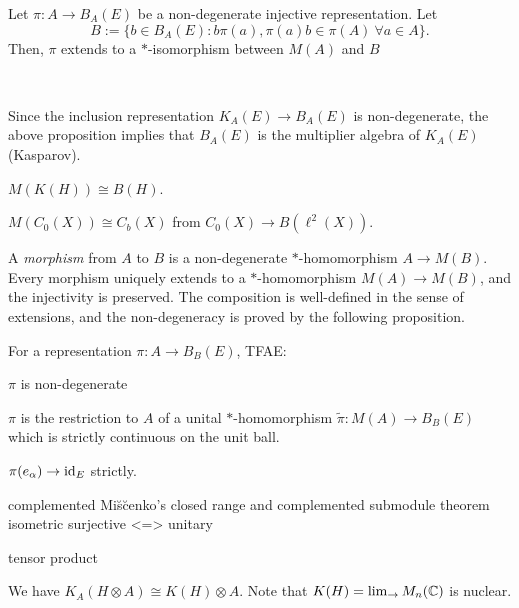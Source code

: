 \documentclass{../../../small}
\begin{document}
\begin{prop}
Let $\pi:A\to B_ A(E)$ be a non-degenerate injective representation.
Let
\[ B:=\{b\in B_ A(E):b\pi(a),\pi(a)b\in\pi(A)\ \forall a\in A\}.\]
Then, $\pi$ extends to a $*$-isomorphism between $M(A)$ and $B$
\end{prop}
\begin{pf}

\end{pf}

\begin{ex}\,
\begin{parts}
\item
Since the inclusion representation $K_ A(E)\to B_ A(E)$ is non-degenerate, the above proposition implies that $B_ A(E)$ is the multiplier algebra of $K_ A(E)$(Kasparov).
\item $M(K(H))\cong B(H)$.
\item $M(C_0(X))\cong C_b(X)$ from $C_0(X)\to B(\ell^2(X))$.
\end{parts}
\end{ex}

\begin{defn}
A \emph{morphism} from $A$ to $B$ is a non-degenerate $*$-homomorphism $A\to M(B)$.
Every morphism uniquely extends to a $*$-homomorphism $M(A)\to M(B)$, and the injectivity is preserved.
The composition is well-defined in the sense of extensions, and the non-degeneracy is proved by the following proposition.
\end{defn}
\begin{lem}
For a representation $\pi:A\to B_ B(E)$, TFAE:
\begin{parts}
\item $\pi$ is non-degenerate
\item $\pi$ is the restriction to $A$ of a unital $*$-homomorphism $\tilde\pi:M(A)\to B_ B(E)$ which is strictly continuous on the unit ball.
\item $\pi(e_\alpha)\to\operatorname{id}_E$ strictly.
\end{parts}
\end{lem}





complemented
Mi\u s\u cenko's closed range and complemented submodule theorem
isometric surjective <=> unitary

tensor product



We have $K_ A(H\otimes A)\cong K(H)\otimes A$. Note that $K(H)=\lim_\to M_n(\mathbb{C})$ is nuclear.
\end{document}
